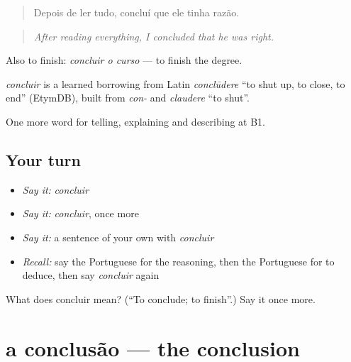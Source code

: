\begin{quote}
Depois de ler tudo, concluí que ele tinha razão.
\end{quote}

\begin{quote}
\emph{After reading everything, I concluded that he was right.}
\end{quote}

Also to finish: \emph{concluir o curso} — to finish the degree.

\begin{cousinweb}
\emph{concluir} is a learned borrowing from Latin \emph{conclūdere} \textquotedblleft{}to shut up, to close, to end\textquotedblright{} (EtymDB), built from \emph{con-} and \emph{claudere} \textquotedblleft{}to shut\textquotedblright{}.
\end{cousinweb}

\begin{grammarlens}[title={What you've built}]
One more word for telling, explaining and describing at B1.
\end{grammarlens}

\subsection*{Your turn}
\begin{itemize}
\raggedright
  \item \emph{Say it:} \emph{concluir}
  \item \emph{Say it:} \emph{concluir}, once more
  \item \emph{Say it:} a sentence of your own with \emph{concluir}
  \item \emph{Recall:} say the Portuguese for the reasoning, then the Portuguese for to deduce, then say \emph{concluir} again
\end{itemize}

\begin{tcolorbox}[breakable,colback=teal!4,colframe=teal!35!black,title={Before you move on}]
What does concluir mean? (\textquotedblleft{}To conclude; to finish\textquotedblright{}.) Say it once more.
\end{tcolorbox}
\section[a conclusão]{a conclusão — the conclusion}

\label{lesson:PT-C346-conclusao}



